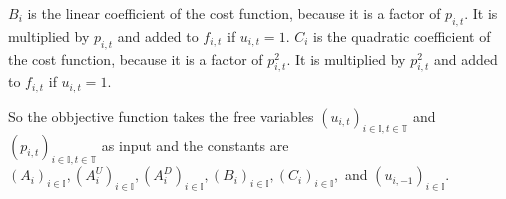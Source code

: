 $B_i$ is the linear coefficient of the cost function,
because it is a factor of $p_{i, t}$.
It is multiplied by $p_{i, t}$ and added to $f_{i, t}$ if $u_{i,  t} = 1$.
$C_i$ is the quadratic coefficient of the cost function,
because it is a factor of $p_{i, t}^2$.
It is multiplied by $p_{i, t}^2$ and added to $f_{i, t}$ if $u_{i,  t} = 1$.

So the obbjective function takes the free variables
$(u_{i, t})_{i \in \mathbb{I}, t \in \mathbb{T}}$
and $(p_{i, t})_{i \in \mathbb{I}, t \in \mathbb{T}}$
as input and the constants are
$
(A_i)_{i \in \mathbb{I}},
(A_i^U)_{i \in \mathbb{I}},
(A_i^D)_{i \in \mathbb{I}},
(B_i)_{i \in \mathbb{I}},
(C_i)_{i \in \mathbb{I}},
$ and $
(u_{i, -1})_{i \in \mathbb{I}}
$.